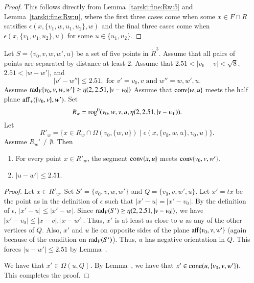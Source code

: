 \begin{proof}  This follows directly from Lemma~\ref{tarski:fine:Rw:5}
and Lemma~\ref{tarski:fine:Rw:u}, where the first three cases
come when some $x\in F\cap R$ satsifies
  $\epsilon(x,\{v_1,w,u_1,u_2\},w)$ and the final three cases
come when $\epsilon(x,\{v_1,u_1,u_2\},u)$ for some $u\in \{u_1,u_2\}$.
\end{proof}



\newpage
\begin{lemma}
Let $S=\{v_0,v,w,w',u\}$ be a set of five points in $\ring{R}^3$.
Assume that all pairs of points are separated by distance at
least $2$. Assume that $2.51<|v_0-v|<\sqrt8$, $2.51<|w-w'|$, and
  $$
  |v'-w''| \le 2.51, \text{ for } v'=v_0,v \text{ and } w''=w,w',u.
  $$
Assume $\operatorname{rad}_V\{v_0,v,w,w'\}\ge\eta(2,2.51,|v-v_0|)$
Assume that ${\operatorname{conv}}\{w,u\}$ meets the
half plane ${\operatorname{aff}}_+(\{v_0,v\},w')$.
Set
  $$R_w={\operatorname{rog}}^0(v_0,w,v,u,\eta(2,2.51,|v-v_0|)).$$
Let 
   $$R'_w = \{x\in R_w \cap\Omega(v_0,\{w,u\}) \mid
     \epsilon(x,\{v_0,w,u\},v_0,u)\}.$$
Assume $R_w'\ne \emptyset$.
Then
\begin{enumerate}
 \item  For every point $x\in R'_w$, the segment ${\operatorname{conv}}\{x,u\}$ meets
  ${\operatorname{conv}}\{v_0,v,w'\}$.
\item $|u-w'|\le 2.51$.
\end{enumerate}
\end{lemma}

\begin{proof} 
Let $x\in R'_w$. Set $S'=\{v_0,v,w,w'\}$ and $Q=\{v_0,v,w',u\}$.
Let $x' = t x$ be the point as in the definition of $\epsilon$ such
that $|x'-u|=|x'-v_0|$.  By the definition of $\epsilon$,
$|x'-u| \le |x'-w|$.  Since $\operatorname{rad}_V(S')\ge\eta(2,2.51,|v-v_0|)$, we have
$|x'-v_0| \le |x-v|,|x-w'|$.  Thus, $x'$ is at least as close to $u$
as any of the other vertices of $Q$.  Also, $x'$
and $u$ lie on opposite sides of the plane ${\operatorname{aff}}\{v_0,v,w'\}$
(again because of the condition on $\operatorname{rad}_V(S')$).  Thus, $u$ has
negative orientation in $Q$.  This forces 
$|u-w'|\le 2.51$ by Lemma~.

We have that $x'\in\Omega(u,Q)$.  By Lemma~,
we have that $x'\in{\operatorname{cone}}(u,\{v_0,v,w'\})$.  This completes
the proof.
\end{proof}

\newpage


